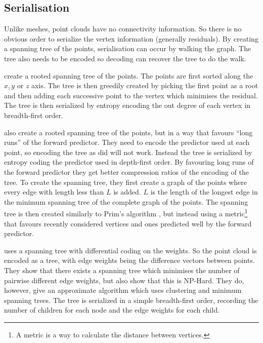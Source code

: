 \documentclass[a4paper]{report}
\begin{document}
\subsection{Serialisation}
\label{sec:serialisation}

Unlike meshes, point clouds have no connectivity information. So there is no
obvious order to serialize the vertex information (generally residuals). By
creating a spanning tree of the points, serialisation can occur by walking the
graph. The tree also needs to be encoded so decoding can recover the tree to
do the walk.

\citet{gumholdcomp} create a rooted spanning tree of the points. The points
are first sorted along the $x, y$ or $z$ axis. The tree is then greedily
created by picking the first point as a root and then adding each successive
point to the vertex which minimises the residual. The tree is then serialized
by entropy encoding the out degree of each vertex in breadth-first order.

\citet{merrycomp} also create a rooted spanning tree of the points, but in a
way that favours ``long runs'' of the forward predictor. They need to encode
the predictor used at each point, so encoding the tree as \citet{gumholdcomp}
did will not work. Instead the tree is serialized by entropy coding the
predictor used in depth-first order. By favouring long runs of the forward
predictor they get better compression ratios of the encoding of the tree. To
create the spanning tree, they first create a graph of the points where every
edge with length less than $L$ is added. $L$ is the length of the longest edge
in the minimum spanning tree of the complete graph of the points. The spanning
tree is then created similarly to Prim's algorithm \citep[p.\ 457]{sedgewick},
but instead using a metric\footnote{A metric is a way to calculate the
  distance between vertices.} that favours recently considered vertices and
ones predicted well by the forward predictor.

\citet{chen2005lcp} uses a spanning tree with differential coding on the
weights. So the point cloud is encoded as a tree, with edge weights being the
difference vectors between points. They show that there exists a spanning tree
which minimises the number of pairwise different edge weights, but also show
that this is NP-Hard. They do, however, give an approximate algorithm which
uses clustering and minimum spanning trees. The tree is serialized in a simple
breadth-first order, recording the number of children for each node and the
edge weights for each child.
\end{document}
